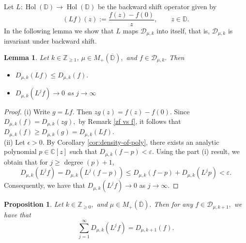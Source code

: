 \documentclass[10pt,oneside,reqno]{amsart}
\newtheorem{lemma}[theorem]{Lemma}
\newtheorem{proposition}[theorem]{Proposition}
\theoremstyle{definition}
\theoremstyle{remark}
\renewcommand{\le}{\leqslant}
\renewcommand{\ge}{\geqslant}
\newcommand{\C}{\mathbb C}
\newcommand{\D}{\mathbb D}
\numberwithin{equation}{section}
\begin{document}
Let $L: \operatorname{Hol} (\D) \to \operatorname{Hol} (\D)$ be the backward shift operator given by
\begin{equation*}
    (Lf)(z) := \frac{f(z)-f(0)}{z}, \qquad z \in \D .
\end{equation*}
In the following lemma we show that $L$ maps $\mathscr D_{\mu, k}$ into itself, that is, $\mathscr D_{\mu,k}$ is invariant under backward shift.
\begin{lemma}\label{prop:closed-under-backward-shift}
	Let $k\in \mathbb Z_{\geqslant 1}$, $\mu\in M_+(\overline{\D}),$ and $f \in\mathscr D_{\mu,k}.$  Then
\begin{itemize}
    \item[\rm (i)] $D_{\mu, k} \left( Lf \right) \le D_{\mu, k} \left( f \right).$
    \item[\rm (ii)] $D_{\mu, k} \left( L^{j}f \right) \to 0$ as $j\to \infty$
\end{itemize}
    \end{lemma}
    \begin{proof}
	 (i) Write $g = Lf$. Then $zg(z) = f(z)-f\left( 0 \right)$. Since $D_{\mu, k} \left( f \right)= D_{\mu, k} \left( zg \right),$ by Remark \ref{zf vs f}, it follows that  $D_{\mu, k} \left( f \right) \ge D_{\mu, k} \left( g \right) =D_{\mu,k } \left( Lf \right).$\\
     
     (ii) Let $\epsilon >0.$ By Corollary \ref{cor:density-of-poly}, there exists an analytic polynomial $p \in \C \left[ z \right]$ such that $D_{\mu,k} \left( f-p \right) < \varepsilon$. Using the part (i) result, we obtain that for $j \ge $ degree $(p)+1$,
	\begin{equation*}
	    D_{\mu, k} \left( L^{j}f \right) = D_{\mu, k} \left( L^{j}\left( f-p \right) \right) \le D_{\mu, k} \left( f-p \right) + D_{\mu, k} \left( L^{j}p \right) < \varepsilon.
	\end{equation*}
	Consequently,  we have that $D_{\mu, k} \left( L^{j}f \right) \to 0$ as $j\to \infty.$
    \end{proof}
    

    \begin{proposition}\label{one step up formula for measure}
    Let $k\in \mathbb Z_{\geqslant 0},$  and $\mu\in M_+(\overline{\D}).$ Then for any $f \in\mathscr D_{\mu,k+1},$ we have that 
    \begin{equation*}
	\sum_{j=1}^{\infty} D_{\mu, k} \left( L^{j}f \right) = D_{\mu, k+1} (f).
    \end{equation*}
    \end{proposition}
    
\end{document}

